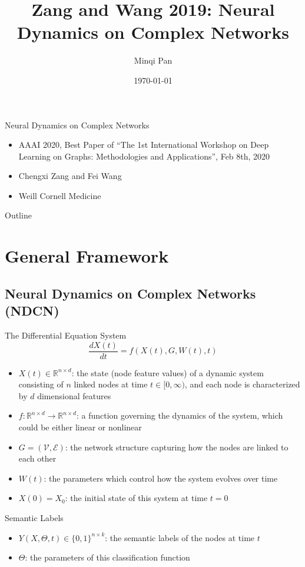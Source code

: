 \documentclass{beamer}
\title{Zang and Wang 2019: Neural Dynamics on Complex Networks}
\author{Minqi Pan}
\date{\today}
\begin{document}
\begin{frame}
  \titlepage
\end{frame}

\begin{frame}{Neural Dynamics on Complex Networks}
\begin{itemize}
\item AAAI 2020, Best Paper of ``The 1st International Workshop on Deep Learning on Graphs: Methodologies and Applications'', Feb 8th, 2020
\item Chengxi Zang and Fei Wang
\item Weill Cornell Medicine
\end{itemize}
\end{frame}

\begin{frame}{Outline}
  \tableofcontents
\end{frame}

\section{General Framework}
\subsection{Neural Dynamics on Complex Networks (NDCN)}
\begin{frame}{The Differential Equation System}
\[
\frac{dX(t)}{dt}=f(X(t),G,W(t),t)
\]
\begin{itemize}
\item $X(t)\in\mathbb{R}^{n\times d}$: the state (node feature values) of a dynamic system consisting of $n$ linked nodes at time $t\in[0,\infty)$, and each node is characterized by $d$ dimensional features
\item $f:\mathbb{R}^{n\times d}\to\mathbb{R}^{n\times d}$: a function governing the dynamics of the system, which could be either linear or nonlinear
\item $G=(\mathcal{V},\mathcal{E})$: the network structure capturing how the nodes are linked to each other
\item $W(t)$: the parameters which control how the system evolves over time
\item $X(0)=X_0$: the initial state of this system at time $t=0$
\end{itemize}
\end{frame}

\begin{frame}{Semantic Labels}
\begin{itemize}
\item $Y(X,\Theta,t)\in\{0,1\}^{n\times k}$: the semantic labels of the nodes at time $t$
\item $\Theta$: the parameters of this classification function
\end{itemize}
\end{frame}
\end{document}
